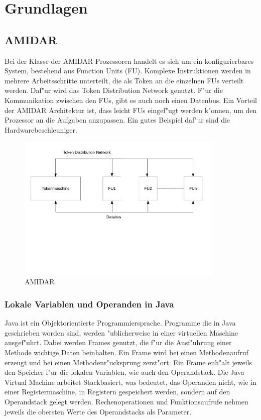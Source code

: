 \chapter{Grundlagen}
\label{cha:Grundlagen}

\section{AMIDAR }
Bei der Klasse der AMIDAR Prozessoren handelt es sich um ein konfigurierbares System, bestehend aus Function Units (FU). Komplexe Instruktionen werden in mehrere Arbeitsschritte unterteilt, die als Token an die einzelnen FUs verteilt werden. Daf"ur wird das Token Distribution Network genutzt. F"ur die Kommunikation zwischen den FUs, gibt es auch noch einen Datenbus. Ein Vorteil der AMIDAR Architektur ist, dass leicht FUs eingef"ugt werden k"onnen, um den Prozessor an die Aufgaben anzupassen. Ein gutes Beispiel daf"ur sind die Hardwarebeschleuniger. \cite{Burkert}\cite{Andresen}

\begin{figure}[H]
	\centering
	\includegraphics[height = 7cm]{PS_RS_graphics/AMIDAR.pdf}
	\caption{AMIDAR}
\end{figure}

\subsection{Lokale Variablen und Operanden in Java}
Java ist ein Objektorientierte Programmiersprache. Programme die in Java geschrieben worden sind, werden "ublicherweise in einer virtuellen Maschine ausgef"uhrt. 
Dabei werden Frames genutzt, die f"ur die Ausf"uhrung einer Methode wichtige Daten beinhalten. Ein Frame wird bei einen Methodenaufruf erzeugt und bei einen Methodenr"ucksprung zerst"ort. Ein Frame enh"alt jeweils den Speicher f"ur die lokalen Variablen, wie auch den Operandstack.  
Die Java Virtual Machine arbeitet Stackbasiert, was bedeutet, das Operanden nicht, wie in einer Registermaschine, in Registern gespeichert werden, sondern auf den Operandstack gelegt werden. Rechenoperationen und Funktionsaufrufe nehmen jeweils die obersten Werte des Operandstacks als Parameter. 

